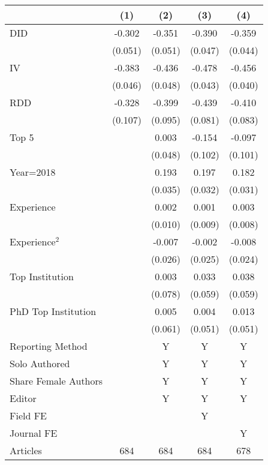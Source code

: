 \begin{tabular}{l*{4}{c}}
\hline\hline
                &\multicolumn{1}{c}{(1)}&\multicolumn{1}{c}{(2)}&\multicolumn{1}{c}{(3)}&\multicolumn{1}{c}{(4)}\\
\hline
DID             &   -0.302&   -0.351&   -0.390&   -0.359\\
                &  (0.051)&  (0.051)&  (0.047)&  (0.044)\\
IV              &   -0.383&   -0.436&   -0.478&   -0.456\\
                &  (0.046)&  (0.048)&  (0.043)&  (0.040)\\
RDD             &   -0.328&   -0.399&   -0.439&   -0.410\\
                &  (0.107)&  (0.095)&  (0.081)&  (0.083)\\
Top 5           &         &    0.003&   -0.154&   -0.097\\
                &         &  (0.048)&  (0.102)&  (0.101)\\
Year=2018       &         &    0.193&    0.197&    0.182\\
                &         &  (0.035)&  (0.032)&  (0.031)\\
Experience      &         &    0.002&    0.001&    0.003\\
                &         &  (0.010)&  (0.009)&  (0.008)\\
Experience$^2$  &         &   -0.007&   -0.002&   -0.008\\
                &         &  (0.026)&  (0.025)&  (0.024)\\
Top Institution &         &    0.003&    0.033&    0.038\\
                &         &  (0.078)&  (0.059)&  (0.059)\\
PhD Top Institution&         &    0.005&    0.004&    0.013\\
                &         &  (0.061)&  (0.051)&  (0.051)\\
Reporting Method &         &        Y&        Y&        Y\\
Solo Authored   &         &        Y&        Y&        Y\\
Share Female Authors &         &        Y&        Y&        Y\\
Editor          &         &        Y&        Y&        Y\\
Field FE        &         &         &        Y&         \\
Journal FE      &         &         &         &        Y\\
\hline
Articles        &      684&      684&      684&      678\\
\hline\hline
\end{tabular}
